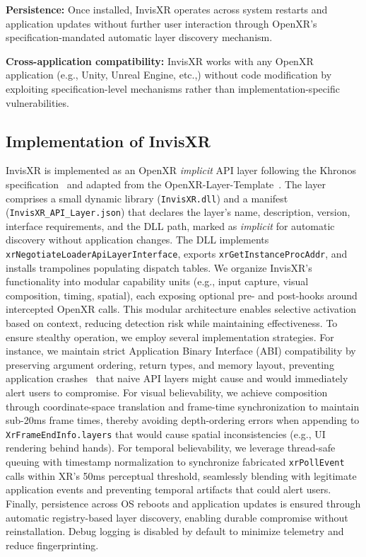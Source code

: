\documentclass[letterpaper,twocolumn,10pt]{article}
\begin{document}
\textbf{Persistence:} Once installed, InvisXR operates across system restarts and application updates without further user interaction through OpenXR's specification-mandated automatic layer discovery mechanism. 

\textbf{Cross-application compatibility:} InvisXR works with any OpenXR application (e.g., Unity, Unreal Engine, etc.,) without code modification by exploiting specification-level mechanisms rather than implementation-specific vulnerabilities.

\subsection{Implementation of InvisXR}
\label{sec:implementation}
InvisXR is implemented as an OpenXR \emph{implicit} API layer following the Khronos specification~\cite{khronosOpenXR} and adapted from the OpenXR-Layer-Template~\cite{bucchia_openxr_layer}. The layer comprises a small dynamic library (\texttt{InvisXR.dll}) and a manifest (\texttt{InvisXR\_API\_Layer.json}) that declares the layer's name, description, version, interface requirements, and the DLL path, marked as \emph{implicit} for automatic discovery without application changes. The DLL implements \texttt{xrNegotiateLoaderApiLayerInterface}, exports \texttt{xrGetInstanceProcAddr}, and installs trampolines populating dispatch tables. We organize InvisXR's functionality into modular capability units (e.g., input capture, visual composition, timing, spatial), each exposing optional pre- and post-hooks around intercepted OpenXR calls. This modular architecture enables selective activation based on context, reducing detection risk while maintaining effectiveness. To ensure stealthy operation, we employ several implementation strategies. For instance, we maintain strict Application Binary Interface (ABI) compatibility by preserving argument ordering, return types, and memory layout, preventing application crashes~\cite{lopez2017survey} that naive API layers might cause and would immediately alert users to compromise. For visual believability, we achieve composition through coordinate-space translation and frame-time synchronization to maintain sub-20ms frame times, thereby avoiding depth-ordering errors when appending to \texttt{XrFrameEndInfo.layers} that would cause spatial inconsistencies (e.g., UI rendering behind hands). For temporal believability, we leverage thread-safe queuing with timestamp normalization to synchronize fabricated \texttt{xrPollEvent} calls within XR's 50ms perceptual threshold, seamlessly blending with legitimate application events and preventing temporal artifacts that could alert users. Finally, persistence across OS reboots and application updates is ensured through automatic registry-based layer discovery, enabling durable compromise without reinstallation. Debug logging is disabled by default to minimize telemetry and reduce fingerprinting.
\end{document}

